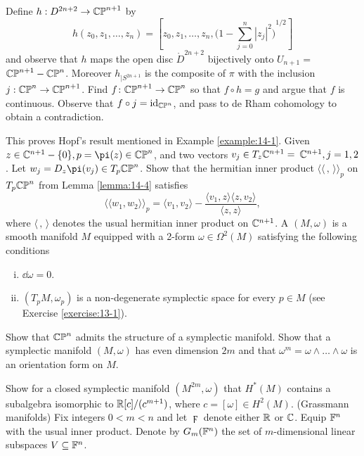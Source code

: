 \begin{enumerate}[\theexercise.1]
    Define $h : {D}^{{2n} + 2} \rightarrow  {\ensuremath{\mathbb{{CP}}}}^{n + 1}$ by
    \[
      h( {{z}_{0},{z}_{1},\ldots,{z}_{n}})  = \left[  {{z}_{0},{z}_{1},\ldots,{z}_{n},{\bigg( 1- \sum_{{j = 0}}^{n}{\left| {z}_{j}\right| }^{2}\bigg) }^{1/2}}\right]
    \]
    and observe that $h$ maps the open disc ${\mathring{D}}^{{2n} + 2}$ bijectively onto ${U}_{n + 1} =$  ${\mathbb{{CP}}}^{n + 1}- {\mathbb{{CP}}}^{n}$. Moreover ${h}_{\mid {S}^{{2n} + 1}}$ is the composite of $\pi$ with the inclusion $j : {\mathbb{{CP}}}^{n} \rightarrow  {\ensuremath{\mathbb{{CP}}}}^{n + 1}$. Find $f\colon {\ensuremath{\mathbb{{CP}}}}^{n + 1} \rightarrow  {\ensuremath{\mathbb{{CP}}}}^{n}$ so that $f \circ  h = g$ and argue that $f$ is continuous. Observe that $f \circ  j = {\mathrm{id}}_{{\mathbb{{CP}}}^{n}}$, and pass to de Rham cohomology to obtain a contradiction.\par
    This proves Hopf's result mentioned in Example \ref{example:14-1}.
  \NewItem Given $z \in  {\B{C}}^{n + 1}- \{ 0\},p = \pi ( z)  \in  {\B{{CP}}}^{n}$, and two vectors ${v}_{j} \in  {T}_{z}{\mathbb{C}}^{n + 1} =$  ${\mathbb{C}}^{n + 1},j = 1,2$. Let ${w}_{j} = {D}_{z}\pi ( {v}_{j})  \in  {T}_{p}{\B{{CP}}}^{n}$. Show that the hermitian inner product $\langle \langle\,,\,\rangle {\rangle }_{p}$ on ${T}_{p}{\mathbb{{CP}}}^{n}$ from Lemma \ref{lemma:14-4} satisfies
    \[
      {\langle  \langle  {w}_{1},{w}_{2}\rangle  \rangle  }_{p} = \langle  {{v}_{1},{v}_{2}}\rangle  - \frac{\langle  {{v}_{1},z}\rangle  \langle  {z,{v}_{2}}\rangle  }{\langle z,z\rangle },
    \]
    where $\langle\,,\, \rangle$ denotes the usual hermitian inner product on ${\mathbb{C}}^{n + 1}$.
  \NewItem A  $( {M,\omega })$ is a smooth manifold $M$ equipped with a 2-form $\omega  \in  {\Omega }^{2}( M)$ satisfying the following conditions
    \begin{enumerate}[(i)]
      \item ${\dd\omega } = 0$.
      \item $( {{T}_{p}M,{\omega }_{p}})$ is a non-degenerate symplectic space for every $p \in  M$%
      (see Exercise \ref{exercise:13-1}).
    \end{enumerate}
    Show that ${\mathbb{{CP}}}^{n}$ admits the structure of a symplectic manifold.
    Show that a symplectic manifold $( {M,\omega })$ has even dimension ${2m}$ and that ${\omega }^{m} = \omega  \land  \ldots  \land  \omega$ is an orientation form on $M$.\par
    Show for a closed symplectic manifold $( {{M}^{2m},\omega })$ that ${H}^*( M)$ contains a subalgebra isomorphic to $\mathbb{R}[  c]  /( {c}^{m + 1})$, where $c = [  \omega ]   \in  {H}^{2}( M)$.
  \NewItem (Grassmann manifolds) Fix integers $0 < m < n$ and let $\digamma$ denote either $\mathbb{R}$ or $\mathbb{C}$. Equip ${\mathbb{F}}^{n}$ with the usual inner product. Denote by ${G}_{m}( {\mathbb{F}}^{n})$ the set of $m$-dimensional linear subspaces $V \subseteq  {\ensuremath{\mathbb{F}}}^{n}$.

\end{enumerate}
